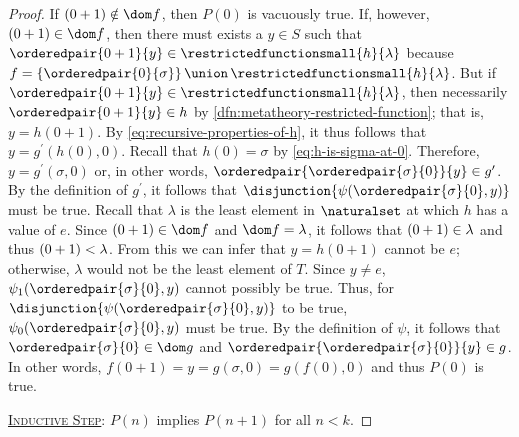 \begin{proof}
    \vspace{0.3cm}
    \noindent
    If \( \mleft( 0 + 1 \mright) \notin \dom f \), then \( P(0) \) is vacuously true.
    If, however, \( \mleft( 0 + 1 \mright) \in \dom f \), then there must exists a \( y \in S \)
    such that \( \orderedpair{0 + 1}{y} \in \restrictedfunctionsmall{h}{\lambda} \)
    because \( f = \mleft\{ \orderedpair{0}{\sigma} \mright\} \,{\union}\, \restrictedfunctionsmall{h}{\lambda} \).
    But if \( \orderedpair{0 + 1}{y} \in \restrictedfunctionsmall{h}{\lambda} \), then necessarily \( \orderedpair{0 + 1}{y} \in h \) by
    \cref{dfn:metatheory-restricted-function}; that is, \( y = h(0 + 1) \).
    By \eqref{eq:recursive-properties-of-h}, it thus follows that \( y = g^{\prime}(h(0), 0) \).
    Recall that \( h(0) = \sigma \) by \eqref{eq:h-is-sigma-at-0}.
    Therefore, \( y = g^{\prime}(\sigma, 0) \) or, in other words, \( \orderedpair{\orderedpair{\sigma}{0}}{y} \in g^{\prime} \).
    By the definition of \( g^{\prime} \), it follows that \( \disjunction{\psi(\orderedpair{\sigma}{0}, y)} \) must be true.
    Recall that \( \lambda \) is the least element in \( \naturalset \) at which \( h \) has a value of \( e \).
    Since \( \mleft( 0 + 1 \mright) \in \dom f \) and \( \dom f = \lambda \), it follows that \( \mleft( 0 + 1 \mright) \in \lambda \)
    and thus \( \mleft( 0 + 1 \mright) < \lambda \).
    From this we can infer that \( y = h(0 + 1) \) cannot be \( e \); otherwise, \( \lambda \) would not be the least element of \( T \).
    Since \( y \neq e \), \( \psi_{1}(\orderedpair{\sigma}{0}, y) \) cannot possibly be true.
    Thus, for \( \disjunction{\psi(\orderedpair{\sigma}{0}, y)} \) to be true,
    \( \psi_{0}(\orderedpair{\sigma}{0}, y) \) must be true.
    By the definition of \( \psi \), it follows that \( \orderedpair{\sigma}{0} \in \dom g \) and \( \orderedpair{\orderedpair{\sigma}{0}}{y} \in g \).
    In other words, \( f(0 + 1) = y = g(\sigma, 0) = g(f(0), 0) \) and thus \( P(0) \) is true.

    \vspace{0.3cm}
    \noindent
    \underline{\scshape Inductive Step}: \( P(n) \) implies \( P(n + 1) \) for all \( n < k \).


\end{proof}
